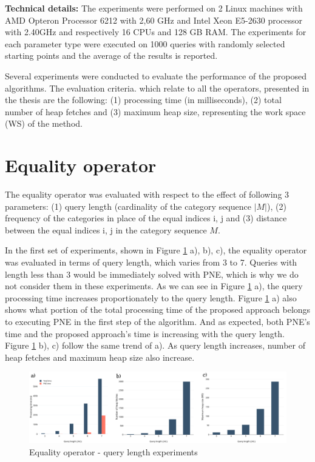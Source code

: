 \textbf{Technical details:}
The experiments were performed on 2 Linux machines with AMD Opteron Processor 6212 with 2,60 GHz and Intel Xeon E5-2630 processor with 2.40GHz and respectively 16 CPUs and 128 GB RAM. The experiments for each parameter type were executed on 1000 queries with randomly selected starting points and the average of the results is reported.

Several experiments were conducted to evaluate the performance of the proposed algorithms. The evaluation criteria. which relate to all the operators, presented in the thesis are the following: (1) processing time (in milliseconds), (2) total number of heap fetches and (3) maximum heap size, representing the work space (WS) of the method.

\section{Equality operator}
\label{sec:experimentsEO}

The equality operator was evaluated with respect to the effect of following 3 parameters: (1) query length (cardinality of the category sequence $|M|$), (2) frequency of the categories in place of the equal indices i, j and (3) distance between the equal indices i, j in the category sequence $M$.

In the first set of experiments, shown in Figure \ref{fig:eo_length} a), b), c), the equality operator was evaluated in terms of query length, which varies from 3 to 7. Queries with length less than 3 would be immediately solved with PNE, which is why we do not consider them in these experiments. 
As we can see in Figure \ref{fig:eo_length} a), the query processing time increases proportionately to the query length. Figure \ref{fig:eo_length} a) also shows what portion of the total processing time of the proposed approach belongs to executing PNE in the first step of the algorithm. And as expected, both PNE's time and the proposed approach's time is increasing with the query length.
Figure \ref{fig:eo_length} b), c) follow the same trend of a). As query length increases, number of heap fetches and maximum heap size also increase.

\begin{figure}[H]
	\includegraphics[scale=0.25]{images/eo_length.png}
	\centering
	\caption{Equality operator - query length experiments}
	\label{fig:eo_length}
\end{figure}

